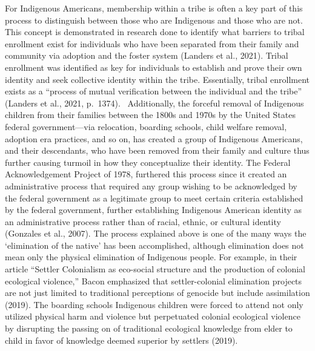 \documentclass[
  12pt,
  letterpaper,
]{article}
\begin{document}
For Indigenous Americans, membership within a tribe is often a key part
of this process to distinguish between those who are Indigenous and
those who are not. This concept is demonstrated in research done to
identify what barriers to tribal enrollment exist for individuals who
have been separated from their family and community via adoption and the
foster system (Landers et al., 2021). Tribal enrollment was identified
as key for individuals to establish and prove their own identity and
seek collective identity within the tribe. Essentially, tribal
enrollment exists as a ``process of mutual verification between the
individual and the tribe'' (Landers et al., 2021, p.~1374).~
Additionally, the forceful removal of Indigenous children from their
families between the 1800s and 1970s by the United States federal
government---via relocation, boarding schools, child welfare removal,
adoption era practices, and so on, has created a group of Indigenous
Americans, and their descendants, who have been removed from their
family and culture thus further causing turmoil in how they
conceptualize their identity. The Federal Acknowledgement Project of
1978, furthered this process since it created an administrative process
that required any group wishing to be acknowledged by the federal
government as a legitimate group to meet certain criteria established by
the federal government, further establishing Indigenous American
identity as an administrative process rather than of racial, ethnic, or
cultural identity (Gonzales et al., 2007). The process explained above
is one of the many ways the `elimination of the native' has been
accomplished, although elimination does not mean only the physical
elimination of Indigenous people. For example, in their article
``Settler Colonialism as eco-social structure and the production of
colonial ecological violence,'' Bacon emphasized that settler-colonial
elimination projects are not just limited to traditional perceptions of
genocide but include assimilation (2019). The boarding schools
Indigenous children were forced to attend not only utilized physical
harm and violence but perpetuated colonial ecological violence by
disrupting the passing on of traditional ecological knowledge from elder
to child in favor of knowledge deemed superior by settlers (2019).
\end{document}

